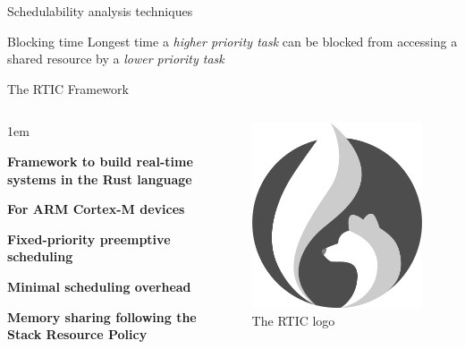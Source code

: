 \begin{frame}{Schedulability analysis techniques}
    \begin{block}{Blocking time}
        Longest time a \emph{higher priority task} can be blocked from accessing a
        shared resource by a \emph{lower priority task}
    \end{block}
\end{frame}




\begin{frame}{The RTIC Framework}
    \begin{columns}
        \begin{itemize-size}{1em}
            \item \textbf{Framework to build real-time systems in the Rust language}
            \item \textbf{For ARM Cortex-M devices}
            \item \textbf{Fixed-priority preemptive scheduling}
            \item \textbf{Minimal scheduling overhead}
            \item \textbf{Memory sharing following the Stack Resource Policy}
        \end{itemize-size}

        \begin{figure}
            \centering
            \includegraphics[scale=0.35]{pictures/RTIC.png}
            \caption{The RTIC logo}
        \end{figure}
    \end{columns}
\end{frame}

